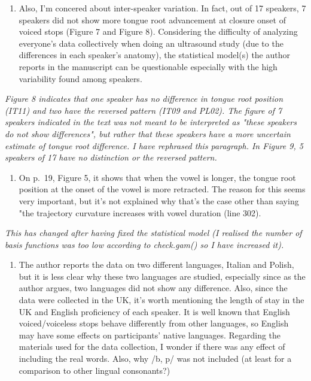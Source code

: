 \documentclass[]{article}
\providecommand{\tightlist}{%
  \setlength{\itemsep}{0pt}\setlength{\parskip}{0pt}}
\begin{document}
\begin{enumerate}
\def\labelenumi{\arabic{enumi}.}
\setcounter{enumi}{1}
\tightlist
\item
  Also, I'm concered about inter-speaker variation. In fact, out of 17
  speakers, 7 speakers did not show more tongue root advancement at
  closure onset of voiced stops (Figure 7 and Figure 8). Considering the
  difficulty of analyzing everyone's data collectively when doing an
  ultrasound study (due to the differences in each speaker's anatomy),
  the statistical model(s) the author reports in the manuscript can be
  questionable especially with the high variability found among
  speakers.
\end{enumerate}

\begin{adjustwidth}{1cm}{} \textit{
Figure 8 indicates that one speaker has no difference in tongue root position (IT11) and two have the reversed pattern (IT09 and PL02). The figure of 7 speakers indicated in the text was not meant to be interpreted as "these speakers do not show differences", but rather that these speakers have a more uncertain estimate of tongue root difference. I have rephrased this paragraph. In Figure 9, 5 speakers of 17 have no distinction or the reversed pattern.
} \end{adjustwidth}

\begin{enumerate}
\def\labelenumi{\arabic{enumi}.}
\setcounter{enumi}{2}
\tightlist
\item
  On p.~19, Figure 5, it shows that when the vowel is longer, the tongue
  root position at the onset of the vowel is more retracted. The reason
  for this seems very important, but it's not explained why that's the
  case other than saying "the trajectory curvature increases with vowel
  duration (line 302).
\end{enumerate}

\begin{adjustwidth}{1cm}{} \textit{
This has changed after having fixed the statistical model (I realised the number of basis functions was too low according to check.gam() so I have increased it).
} \end{adjustwidth}

\begin{enumerate}
\def\labelenumi{\arabic{enumi}.}
\setcounter{enumi}{3}
\tightlist
\item
  The author reports the data on two different languages, Italian and
  Polish, but it is less clear why these two languages are studied,
  especially since as the author argues, two languages did not show any
  difference. Also, since the data were collected in the UK, it's worth
  mentioning the length of stay in the UK and English proficiency of
  each speaker. It is well known that English voiced/voiceless stops
  behave differently from other languages, so English may have some
  effects on participants' native languages. Regarding the materials
  used for the data collection, I wonder if there was any effect of
  including the real words. Also, why /b, p/ was not included (at least
  for a comparison to other lingual consonants?)
\end{enumerate}
\end{document}

